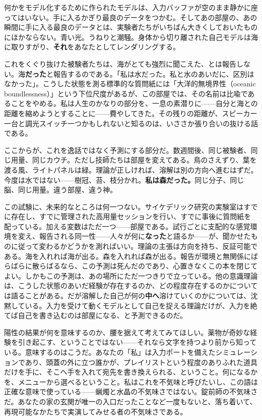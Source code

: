 \documentclass[11pt, twoside, openright]{book}
\begin{document}
何かをモデル化するために作られたモデルは、入力バッファが空のまま静かに座ってはいない。手に入るかぎり最良のデータをつかむ。そしてあの部屋の、あの瞬間に手に入る最良のデータとは、実験者たちがいちばん大きくしておいたものにほかならない。青い光。うねりと潮騒。身体から切り離された自己モデルは海に取りすがり、\textbf{それ}をあなたとしてレンダリングする。

これをくぐり抜けた被験者たちは、海がとても強烈に聞こえた、とは報告しない。海\textbf{だった}と報告するのである。「私は水だった。私と水のあいだに、区別はなかった」。こうした状態を測る標準的な質問紙には「大洋的無境界性（oceanic boundlessness）」という下位尺度があるが、この部屋では、その名前は比喩であることをやめる。私は人生のかなりの部分を、一息の素潜りに------自分と海との距離を縮めようとすることに------費やしてきた。その残りの距離が、スピーカー一台と調光スイッチ一つかもしれないと知るのは、いささか張り合いの抜ける話である。

ここからが、これを逸話ではなく予測にする部分だ。数週間後、同じ被験者、同じ用量、同じカウチ。ただし技師たちは部屋を変えてある。鳥のさえずり、葉を渡る風、ライトパネルは緑。理論が正しければ、溶解は別の方向へ進むはずだ。今度は水ではない------樹冠、苔、枝分かれ。\textbf{私は森だった。}同じ分子、同じ脳、同じ用量。違う部屋、違う神。

この試験に、未来的なところは何一つない。サイケデリック研究の実験室はすでに存在し、すでに管理された高用量セッションを行い、すでに事後に質問紙を配っている。加える変数はただ一つ------部屋である。試行ごとに支配的な感覚環境を変え、報告される同一性------人々が何に\textbf{なった}と語るか------が、聞かせたものに従って変わるかどうかを測ればいい。理論の主張は方向を持ち、反証可能である。海を入れれば海が出る。森を入れれば森が出る。報告が環境と無関係にばらばらに散らばるなら、この予測は死んだのであり、心置きなくこの本を閉じてよい。しかもこの予測は、あの場所にただ一つきりで立っている。他の意識理論は、こうした状態のあいだ経験が存在するのか、どの程度存在するのかについては語ることがある。だが溶解した自己が何の\textbf{中へ}溶けていくのかについては、沈黙している。入力を受けて動くモデルとして自己を捉える理論だけが、入力を絶てば自己を書き込むのは部屋になる、と予測できるのだ。

陽性の結果が何を意味するのか、腰を据えて考えてみてほしい。薬物が奇妙な経験を引き起こす、ということではない------それなら文字を持つより前から知っている。意味するのはこうだ。あなたの「私」は入力ポートを備えたシミュレーションであり、頭蓋の外に立つ誰かが、プレイリストという程度のありふれた道具だけを手に、そこへ手を入れて宛先を書き換えられる、ということ。何になるかを、メニューから選べるということ。私はこれを不気味と呼びたいし、この語は正確な意味で使っている------蝋燭と水晶の不気味さではない。錠前師の不気味さだ。あなたの家の玄関が唯一の入口だったことなど一度もないと、落ち着いて、再現可能なかたちで実演してみせる者の不気味さである。
\end{document}
